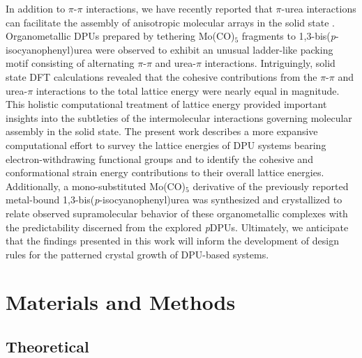 In addition to $\pi$-$\pi$ interactions, we have recently reported that $\pi$-urea interactions can facilitate the assembly of anisotropic molecular arrays in the solid state \citep{Millard2019a}. Organometallic DPUs prepared by tethering Mo(CO)$_{5}$ fragments to 1,3-bis(\textit{p}-isocyanophenyl)urea were observed to exhibit an unusual ladder-like packing motif consisting of alternating $\pi$-$\pi$ and urea-$\pi$ interactions. Intriguingly, solid state DFT calculations revealed that the cohesive contributions from the $\pi$-$\pi$ and urea-$\pi$ interactions to the total lattice energy were nearly equal in magnitude. This holistic computational treatment of lattice energy provided important insights into the subtleties of the intermolecular interactions governing molecular assembly in the solid state. The present work describes a more expansive computational effort to survey the lattice energies of DPU systems bearing electron-withdrawing functional groups and to identify the cohesive and conformational strain energy contributions to their overall lattice energies. Additionally, a mono-substituted Mo(CO)$_{5}$ derivative of the previously reported metal-bound 1,3-bis(\textit{p}-isocyanophenyl)urea was synthesized and crystallized to relate observed supramolecular behavior of these organometallic complexes with the predictability discerned from the explored \textit{p}DPUs. Ultimately, we anticipate that the findings presented in this work will inform the development of design rules for the patterned crystal growth of DPU-based systems.  

\section{Materials and Methods}
\subsection{Theoretical}

